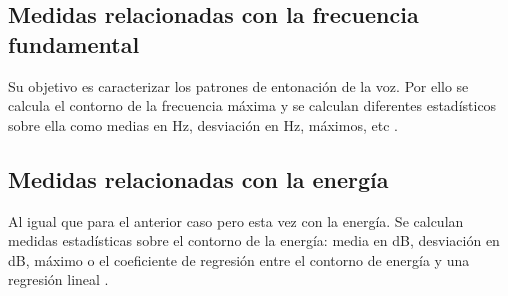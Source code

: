 \subsection{Medidas relacionadas con la frecuencia fundamental}
Su objetivo es caracterizar los patrones de entonación de la voz. Por ello se calcula el contorno de la frecuencia máxima y se calculan diferentes estadísticos sobre ella como medias en Hz, desviación en Hz, máximos, etc \cite{neurospeech}.

\subsection{Medidas relacionadas con la energía}
Al igual que para el anterior caso pero esta vez con la energía. Se calculan medidas estadísticas sobre el contorno de la energía: media en dB, desviación en dB, máximo o el coeficiente de regresión entre el contorno de energía y una regresión lineal \cite{neurospeech}.
